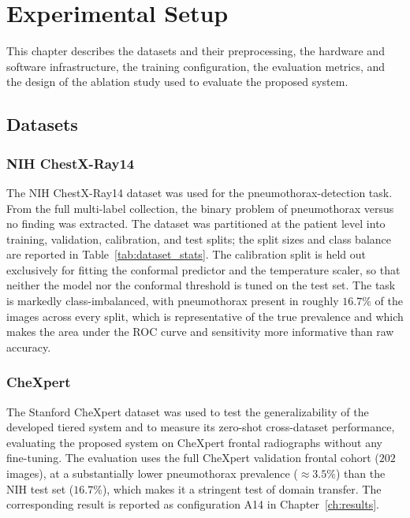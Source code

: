 \chapter{Experimental Setup}
\label{ch:experimental_setup}

This chapter describes the datasets and their preprocessing, the hardware and software infrastructure, the training configuration, the evaluation metrics, and the design of the ablation study used to evaluate the proposed system.

\section{Datasets}
\subsection{NIH ChestX-Ray14}
The NIH ChestX-Ray14 dataset \cite{wang2017chestxray} was used for the pneumothorax-detection task. From the full multi-label collection, the binary problem of pneumothorax versus no finding was extracted. The dataset was partitioned at the patient level into training, validation, calibration, and test splits; the split sizes and class balance are reported in Table~\ref{tab:dataset_stats}. The calibration split is held out exclusively for fitting the conformal predictor and the temperature scaler, so that neither the model nor the conformal threshold is tuned on the test set. The task is markedly class-imbalanced, with pneumothorax present in roughly $16.7\%$ of the images across every split, which is representative of the true prevalence and which makes the area under the ROC curve and sensitivity more informative than raw accuracy.



\subsection{CheXpert}
The Stanford CheXpert dataset \cite{irvin2019chexpert} was used to test the generalizability of the developed tiered system and to measure its zero-shot cross-dataset performance, evaluating the proposed system on CheXpert frontal radiographs without any fine-tuning. The evaluation uses the full CheXpert validation frontal cohort ($202$ images), at a substantially lower pneumothorax prevalence ($\approx 3.5\%$) than the NIH test set ($16.7\%$), which makes it a stringent test of domain transfer. The corresponding result is reported as configuration A14 in Chapter~\ref{ch:results}.

